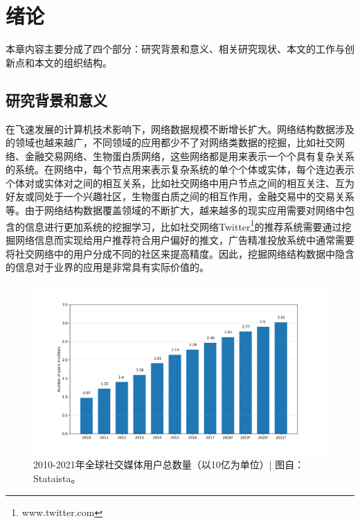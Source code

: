 \chapter{绪论}

本章内容主要分成了四个部分：研究背景和意义、相关研究现状、本文的工作与创新点和本文的组织结构。
\section{研究背景和意义}

在飞速发展的计算机技术影响下，网络数据规模不断增长扩大。网络结构数据涉及的领域也越来越广，不同领域的应用都少不了对网络类数据的挖掘，比如社交网络、金融交易网络、生物蛋白质网络，这些网络都是用来表示一个个具有复杂关系的系统。在网络中，每个节点用来表示复杂系统的单个个体或实体，每个连边表示个体对或实体对之间的相互关系，比如社交网络中用户节点之间的相互关注、互为好友或同处于一个兴趣社区，生物蛋白质之间的相互作用，金融交易中的交易关系等。由于网络结构数据覆盖领域的不断扩大，越来越多的现实应用需要对网络中包含的信息进行更加系统的挖掘学习，比如社交网络Twitter\footnote{www.twitter.com}的推荐系统需要通过挖掘网络信息而实现给用户推荐符合用户偏好的推文，广告精准投放系统中通常需要将社交网络中的用户分成不同的社区来提高精度。因此，挖掘网络结构数据中隐含的信息对于业界的应用是非常具有实际价值的。

\begin{figure}
	\centering
	\includegraphics[width=5.5in]{figures/social_media_stat}
	\caption{2010-2021年全球社交媒体用户总数量（以10亿为单位）| 图自：Stataista。}
\end{figure}

